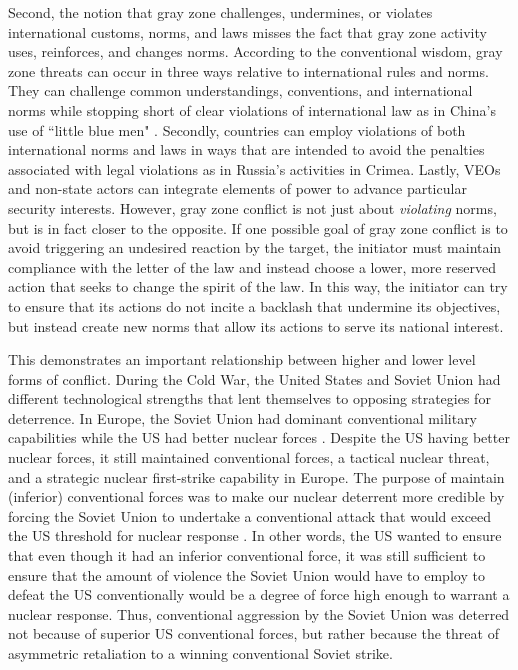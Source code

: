 \documentclass[12pt,letterpaper]{article}
\begin{document}
		Second, the notion that gray zone challenges, undermines, or violates international customs, norms, and laws misses the fact that gray zone activity uses, reinforces, and changes norms. According to the conventional wisdom, gray zone threats can occur in three ways relative to international rules and norms. They can challenge common understandings, conventions, and international norms while stopping short of clear violations of international law as in China's use of ``little blue men" \citep{gady_littlebluemen_2015}. Secondly, countries can employ violations of both international norms and laws in ways that are intended to avoid the penalties associated with legal violations as in Russia's activities in Crimea. Lastly, VEOs and non-state actors can integrate elements of power to advance particular security interests. However, gray zone conflict is not just about \textit{violating} norms, but is in fact closer to the opposite. If one possible goal of gray zone conflict is to avoid triggering an undesired reaction by the target, the initiator must maintain compliance with the letter of the law and instead choose a lower, more reserved action that seeks to change the spirit of the law. In this way, the initiator can try to ensure that its actions do not incite a backlash that undermine its objectives, but instead create new norms that allow its actions to serve its national interest.
		
		This demonstrates an important relationship between higher and lower level forms of conflict. During the Cold War, the United States and Soviet Union had different technological strengths that lent themselves to opposing strategies for deterrence. In Europe, the Soviet Union had dominant conventional military capabilities while the US had better nuclear forces  \citep{snyder_balancepowerbalance_1967}. Despite the US having better nuclear forces, it still maintained conventional forces, a tactical nuclear threat, and a strategic nuclear first-strike capability in Europe. The purpose of maintain (inferior) conventional forces was to make our nuclear deterrent more credible by forcing the Soviet Union to undertake a conventional attack that would exceed the US threshold for nuclear response \citep{snyder_balancepowerbalance_1967}. In other words, the US wanted to ensure that even though it had an inferior conventional force, it was still sufficient to ensure that the amount of violence the Soviet Union would have to employ to defeat the US conventionally would be a degree of force high enough to warrant a nuclear response. Thus, conventional aggression by the Soviet Union was deterred not because of superior US conventional forces, but rather because the threat of asymmetric retaliation to a winning conventional Soviet strike.
		
\end{document}
